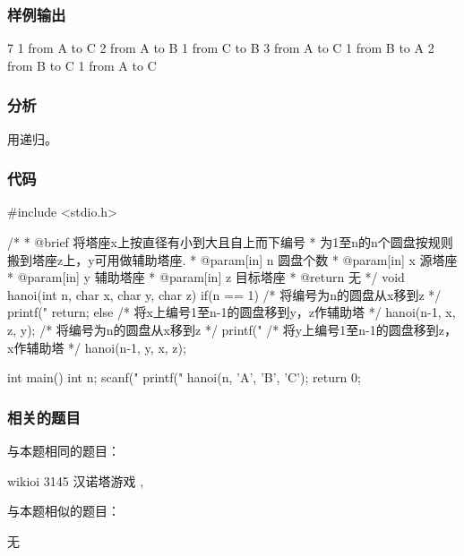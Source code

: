 \subsubsection{样例输出}
\begin{Code}
7
1 from A to C
2 from A to B
1 from C to B
3 from A to C
1 from B to A
2 from B to C
1 from A to C
\end{Code}

\subsubsection{分析}
用递归。


\subsubsection{代码}

\begin{Codex}[label=hanoi.c]
#include <stdio.h>

/*
 * @brief 将塔座x上按直径有小到大且自上而下编号
 * 为1至n的n个圆盘按规则搬到塔座z上，y可用做辅助塔座.
 * @param[in] n 圆盘个数
 * @param[in] x 源塔座
 * @param[in] y 辅助塔座
 * @param[in] z 目标塔座
 * @return 无
 */
void hanoi(int n, char x, char y, char z) {
    if(n ==  1) {
        /* 将编号为n的圆盘从x移到z */
        printf("%
        return;
    } else {
        /* 将x上编号1至n-1的圆盘移到y，z作辅助塔 */
        hanoi(n-1, x, z, y);
        /* 将编号为n的圆盘从x移到z */
        printf("%
        /* 将y上编号1至n-1的圆盘移到z，x作辅助塔 */
        hanoi(n-1, y, x, z);
    }
}

int main() {
    int n;
    scanf("%
    printf("%
    hanoi(n, 'A', 'B', 'C');
    return 0;
}
\end{Codex}


\subsubsection{相关的题目}
与本题相同的题目：
\begindot
\item wikioi 3145 汉诺塔游戏 , 
\myenddot

与本题相似的题目：
\begindot
\item  无
\myenddot



